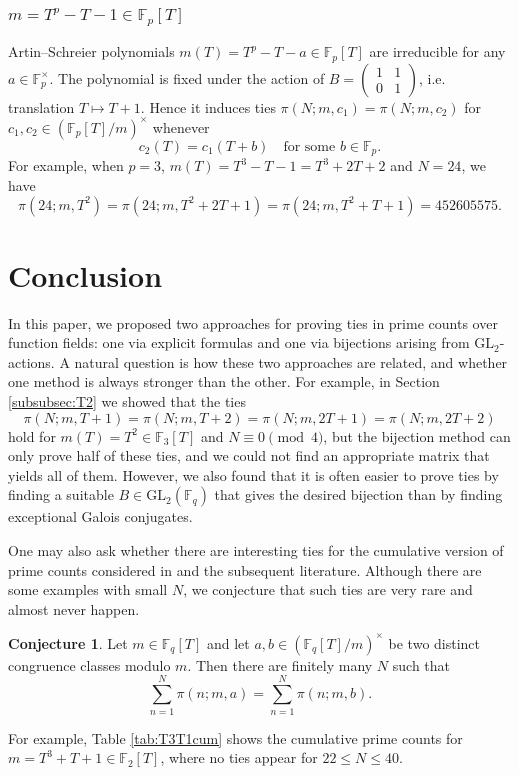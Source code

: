 \documentclass[10pt,reqno]{amsproc}
\newcommand{\GL}{\mathrm{GL}}
\newcommand{\bF}{\mathbb{F}}
\newcommand{\1}{\mathds{1}}	%
\theoremstyle{definition}
\newtheorem{conjecture}[theorem]{Conjecture}
\theoremstyle{remark}
\begin{document}
\subsubsection{\texorpdfstring{\(m = T^p - T - 1 \in \bF_p[T]\)}{m = T^p - T - 1 over characteristic p}}

Artin--Schreier polynomials $m(T) = T^p - T - a \in \bF_p[T]$ are irreducible for any $a \in \bF_p^\times$.
The polynomial is fixed under the action of $B = \left(\begin{smallmatrix} 1 & 1 \\ 0 & 1 \end{smallmatrix}\right)$, i.e. translation $T \mapsto T + 1$.
Hence it induces ties $\pi(N; m, c_1) = \pi(N; m, c_2)$ for $c_1, c_2 \in (\bF_p[T] / m)^\times$ whenever
\[
c_2(T) = c_1(T + b)\quad\text{for some}\,\,b \in \bF_p.
\]
For example, when $p = 3$, $m(T) = T^3 - T - 1 = T^3 + 2T + 2$ and $N = 24$, we have
\[
\pi(24; m, T^2) = \pi(24; m, T^2 + 2T + 1) = \pi(24; m, T^2 + T + 1) = 452605575.
\]

\section{Conclusion}

In this paper, we proposed two approaches for proving ties in prime counts over function fields: one via explicit formulas and one via bijections arising from \(\GL_2\)-actions.
A natural question is how these two approaches are related, and whether one method is always stronger than the other.
For example, in Section \ref{subsubsec:T2} we showed that the ties
\[
\pi(N; m, T + 1) = \pi(N; m, T + 2) = \pi(N; m, 2T + 1) = \pi(N; m, 2T + 2)
\]
hold for $m(T) = T^2 \in \mathbb{F}_3[T]$ and $N \equiv 0 \pmod{4}$, but the bijection method can only prove half of these ties, and we could not find an appropriate matrix that yields all of them. However, we also found that it is often easier to prove ties by finding a suitable $B \in \GL_2(\bF_q)$ that gives the desired bijection than by finding exceptional Galois conjugates.

One may also ask whether there are interesting ties for the cumulative version of prime counts considered in \cite{cha2008chebyshev} and the subsequent literature.
Although there are some examples with small $N$, we conjecture that such ties are very rare and almost never happen.
\begin{conjecture}
    Let $m \in \mathbb{F}_q[T]$ and let $a, b \in (\mathbb{F}_q[T]/m)^\times$ be two distinct congruence classes modulo $m$.
    Then there are finitely many $N$ such that
    \[
        \sum_{n=1}^{N} \pi(n; m, a) = \sum_{n=1}^{N} \pi(n; m, b).
    \]
\end{conjecture}
For example, Table \ref{tab:T3T1cum} shows the cumulative prime counts for $m = T^3 + T + 1 \in \bF_2[T]$, where no ties appear for $22 \le N \le 40$.
\end{document}
